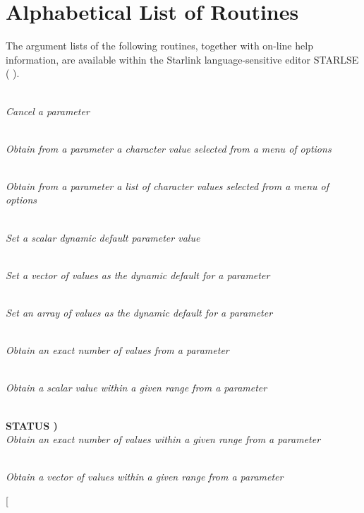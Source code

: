 \documentclass[twoside,11pt,nolof]{starlink}
\providecommand{\listline}{\hspace{1pt}\\}
\providecommand{\listova}[1]{}
\providecommand{\listovb}[1]{\textbf{#1}\\}
\begin{document}
\newpage
\appendix
\small

\section{Alphabetical List of Routines}
The argument lists of the following routines, together with on-line
help information, are available within the Starlink language-sensitive
editor STARLSE (
).
\begin{description}
\item [
( PARAM, STATUS )] \listline
\textit{Cancel a parameter}
\item [
( PARAM, DEFAUL, OPTS, NULL, VALUE, STATUS )] \listline
\textit{Obtain from a parameter a character value selected from a menu
            of options}
\item [
( PARAM, MAXVAL, OPTS, VALUES, ACTVAL, STATUS )] \listline
\textit{Obtain from a parameter a list of character values selected from
            a menu of options}
\item [
( PARAM, VALUE, STATUS )] \listline
\textit{Set a scalar dynamic default parameter value}
\item [
( PARAM, NVAL VALUES, STATUS )] \listline
\textit{Set a vector of values as the dynamic default for a parameter}
\item [
( PARAM, NDIM, MAXD, VALUES, ACTD, STATUS )] \listline
\textit{Set an array of values as the dynamic default for a parameter}
\item [
( PARAM, NVALS, VALUES, STATUS )] \listline
\textit{Obtain an exact number of values from a parameter}
\item [
( PARAM, DEFAUL, VMIN, VMAX, NULL, VALUE, STATUS )] \listline
\textit{Obtain a scalar value within a given range from a parameter}
\item [
( PARAM, NVALS, DEFAUL, VMIN, VMAX, NULL, VALUES, \listova{STATUS )}] \listline
\listovb{STATUS )}
\textit{Obtain an exact number of values within a given range from a parameter}
\item [
( PARAM, MAXVAL, VMIN, VMAX, VALUES, ACTVAL, STATUS )] \listline
\textit{Obtain a vector of values within a given range from a parameter}
\item [

\end{description}
\end{document}
